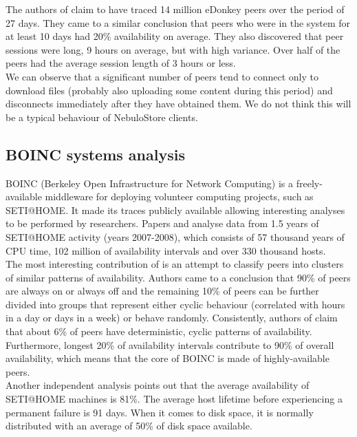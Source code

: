 \documentclass{pracamgren}
\begin{document}
The authors of \cite{edonkey} claim to have traced 14 million eDonkey peers over the period of 27 days. They came to a similar conclusion that peers who were in the system for at least 10 days had 20\% availability on average. They also discovered that peer sessions were long, 9 hours on average, but with high variance. Over half of the peers had the average session length of 3 hours or less.\\

We can observe that a significant number of peers tend to connect only to download files (probably also uploading some content during this period) and disconnects immediately after they have obtained them. We do not think this will be a typical behaviour of NebuloStore clients.\\

\subsection{BOINC systems analysis}

BOINC (Berkeley Open Infrastructure for Network Computing) is a freely-available middleware for deploying volunteer computing projects, such as SETI@HOME. It made its traces publicly available allowing interesting analyses to be performed by researchers. Papers \cite{availability} and \cite{seti} analyse data from 1.5 years of SETI@HOME activity (years 2007-2008), which consists of 57 thousand years of CPU time, 102 million of availability intervals and over 330 thousand hosts.\\

The most interesting contribution of \cite{availability} is an attempt to classify peers into clusters of similar patterns of availability. Authors came to a conclusion that 90\% of peers are always on or always off and the remaining 10\% of peers can be further divided into groups that represent either cyclic behaviour (correlated with hours in a day or days in a week) or behave randomly. Consistently, authors of \cite{seti} claim that about 6\% of peers have deterministic, cyclic patterns of availability. Furthermore, longest 20\% of availability intervals contribute to 90\% of overall availability, which means that the core of BOINC is made of highly-available peers.\\

Another independent analysis \cite{storage} points out that the average availability of SETI@HOME machines is 81\%. The average host lifetime before experiencing a permanent failure is 91 days. When it comes to disk space, it is normally distributed with an average of 50\% of disk space available.\\
\end{document}
